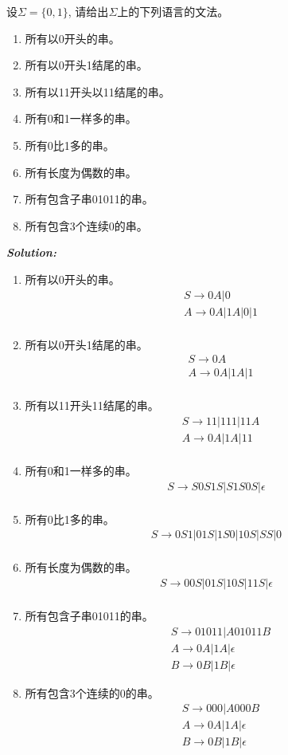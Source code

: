 \documentclass[a4paper]{ctexart}
\begin{document}
 设$\Sigma=\{0,1\}$, 请给出$\Sigma$上的下列语言的文法。
\begin{enumerate}[(1)]
\item 所有以0开头的串。
\item 所有以0开头1结尾的串。
\item 所有以11开头以11结尾的串。
\item 所有0和1一样多的串。
\item 所有0比1多的串。
\item 所有长度为偶数的串。
\item 所有包含子串01011的串。
\item 所有包含3个连续0的串。
\end{enumerate}
\textbf{\emph{Solution:}}
\begin{enumerate}[(1)]
\item 所有以0开头的串。
\[
\begin{split}
&S\to 0A|0\\
&A\to 0A|1A|0|1\\
\end{split}
\]
\item 所有以0开头1结尾的串。
\[
\begin{split}
&S\to 0A\\
&A\to 0A|1A|1\\
\end{split}
\]
\item 所有以11开头11结尾的串。
\[
\begin{split}
&S\to 11|111|11A\\
&A\to 0A|1A|11\\
\end{split}
\]
\item 所有0和1一样多的串。
\[
\begin{split}
S\to S0S1S|S1S0S|\epsilon\\
\end{split}
\]
\item 所有0比1多的串。
\[
\begin{split}
S\to 0S1|01S|1S0|10S|SS|0\\
\end{split}
\]
\item 所有长度为偶数的串。
\[
\begin{split}
S\to 00S|01S|10S|11S|\epsilon\\
\end{split}
\]
\item 所有包含子串01011的串。
\[
\begin{split}
&S\to 01011|A01011B\\
&A\to 0A|1A|\epsilon\\
&B\to 0B|1B|\epsilon
\end{split}
\]
\item 所有包含3个连续的0的串。
\[
\begin{split}
&S\to 000|A000B\\
&A\to 0A|1A|\epsilon\\
&B\to 0B|1B|\epsilon
\end{split}
\]
\end{enumerate}
\end{document}
